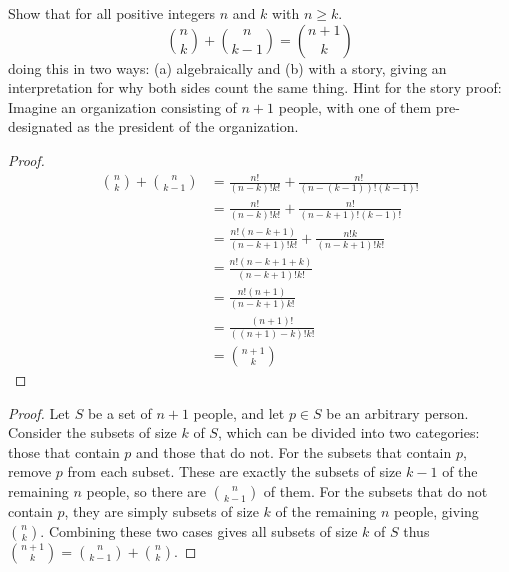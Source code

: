 \begin{tcolorbox}[title=Problem 16, breakable]
    Show that for all positive integers $n$ and $k$ with $n \ge k$.
    \[\binom{n}{k} + \binom{n}{k - 1} = \binom{n + 1}{k}\]
    doing this in two ways: (a) algebraically and (b) with a story, giving an 
    interpretation for why both sides count the same thing.
    Hint for the story proof: Imagine an organization consisting of $n + 1$ people,
    with one of them pre-designated as the president of the organization.
\end{tcolorbox}

\begin{proof}
    \begin{align*}
        \binom{n}{k} + \binom{n}{k - 1} 
            &= \frac{n!}{(n - k)!k!} + \frac{n!}{(n - (k - 1))!(k - 1)!} \\
            &= \frac{n!}{(n - k)!k!} + \frac{n!}{(n - k + 1)!(k - 1)!} \\
            &= \frac{n!(n - k + 1)}{(n - k + 1)! k!} + \frac{n! k}{(n - k + 1)! k!} \\
            &= \frac{n! (n - k + 1 + k)}{(n - k + 1)!k!} \\
            &= \frac{n!(n + 1)}{(n - k + 1)k!} \\
            &= \frac{(n + 1)!}{((n + 1) - k)! k!} \\
            &= \binom{n + 1}{k}
    \end{align*}
\end{proof}

\begin{proof}
    Let $S$ be a set of $n + 1$ people, and let $p \in S$ be an arbitrary person.
    Consider the subsets of size $k$ of $S$, which can be divided into two categories:
    those that contain $p$ and those that do not.
    For the subsets that contain $p$, remove $p$ from each subset.  
    These are exactly the subsets of size $k-1$ of the remaining $n$ people, 
    so there are $\binom{n}{k-1}$ of them.
    For the subsets that do not contain $p$, they are simply subsets of size $k$ 
    of the remaining $n$ people, giving $\binom{n}{k}$.
    Combining these two cases gives all subsets of size $k$ of $S$
        thus $\binom{n+1}{k} = \binom{n}{k-1} + \binom{n}{k}$.
\end{proof}

